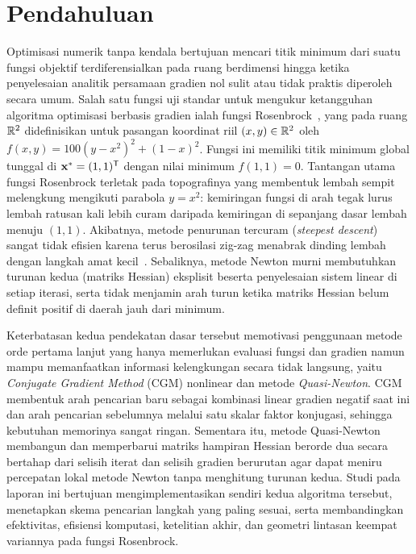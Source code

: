 \documentclass[12pt,a4paper]{article}
\begin{document}
\section{Pendahuluan}
Optimisasi numerik tanpa kendala bertujuan mencari titik minimum dari suatu fungsi objektif terdiferensialkan pada
ruang berdimensi hingga ketika penyelesaian analitik persamaan gradien nol sulit atau tidak praktis diperoleh secara
umum. Salah satu fungsi uji standar untuk mengukur ketangguhan algoritma optimisasi berbasis gradien ialah fungsi
Rosenbrock~\cite{rosenbrock}, yang pada ruang $\mathbb{R}^2$ didefinisikan untuk pasangan koordinat riil $(x,y)\in\mathbb{R}^2$ oleh
$f(x,y)=100(y-x^2)^2+(1-x)^2$. Fungsi ini memiliki titik minimum global tunggal di $\mathbf{x}^*=(1,1)^{\mathsf{T}}$ dengan nilai
minimum $f(1,1)=0$. Tantangan utama fungsi Rosenbrock terletak pada topografinya yang membentuk lembah sempit
melengkung mengikuti parabola $y=x^2$: kemiringan fungsi di arah tegak lurus lembah ratusan kali lebih curam daripada
kemiringan di sepanjang dasar lembah menuju $(1,1)$. Akibatnya, metode penurunan tercuram (\emph{steepest descent})
sangat tidak efisien karena terus berosilasi zig-zag menabrak dinding lembah dengan langkah amat kecil~\cite{nocedal}.
Sebaliknya, metode Newton murni membutuhkan turunan kedua (matriks Hessian) eksplisit beserta penyelesaian sistem
linear di setiap iterasi, serta tidak menjamin arah turun ketika matriks Hessian belum definit positif di daerah jauh
dari minimum.

Keterbatasan kedua pendekatan dasar tersebut memotivasi penggunaan metode orde pertama lanjut yang hanya memerlukan
evaluasi fungsi dan gradien namun mampu memanfaatkan informasi kelengkungan secara tidak langsung, yaitu
\emph{Conjugate Gradient Method} (CGM) nonlinear dan metode \emph{Quasi-Newton}. CGM membentuk arah pencarian baru
sebagai kombinasi linear gradien negatif saat ini dan arah pencarian sebelumnya melalui satu skalar faktor konjugasi,
sehingga kebutuhan memorinya sangat ringan. Sementara itu, metode Quasi-Newton membangun dan memperbarui matriks
hampiran Hessian berorde dua secara bertahap dari selisih iterat dan selisih gradien berurutan agar dapat meniru
percepatan lokal metode Newton tanpa menghitung turunan kedua. Studi pada laporan ini bertujuan mengimplementasikan
sendiri kedua algoritma tersebut, menetapkan skema pencarian langkah yang paling sesuai, serta membandingkan efektivitas,
efisiensi komputasi, ketelitian akhir, dan geometri lintasan keempat variannya pada fungsi Rosenbrock.
\end{document}
